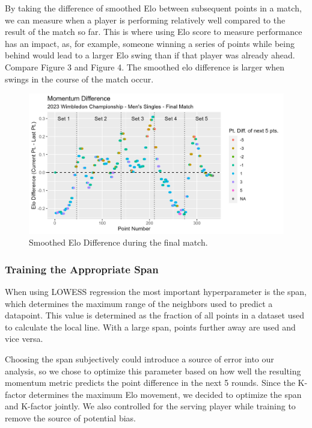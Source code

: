 \documentclass[letterpaper, 12pt]{article}
\begin{document}
            \noindent
            By taking the difference of smoothed Elo between subsequent points in a match, we can measure when a player is performing relatively well compared to the result of the match so far. This is where using Elo score to measure performance has an impact, as, for example, someone winning a series of points while being behind would lead to a larger Elo swing than if that player was already ahead. Compare Figure 3 and Figure 4. The smoothed elo difference is larger when swings in the course of the match occur.
            
            \begin{figure}[H]
                \centering
                \includegraphics[keepaspectratio, width = \textwidth]{Figures/Final_Match_Momentum_Difference.png}
                \caption{Smoothed Elo Difference during the final match.}
                \label{fig:diff_final}
            \end{figure}

            

            \subsubsection{Training the Appropriate Span}
            When using LOWESS regression the most important hyperparameter is the span, which determines the maximum range of the neighbors used to predict a datapoint. This value is determined as the fraction of all points in a dataset used to calculate the local line. With a large span, points further away are used and vice versa. 
            
            Choosing the span subjectively could introduce a source of error into our analysis, so we chose to optimize this parameter based on how well the resulting momentum metric predicts the point difference in the next 5 rounds. Since the K-factor determines the maximum Elo movement, we decided to optimize the span and K-factor jointly. We also controlled for the serving player while training to remove the source of potential bias. 
\end{document}
